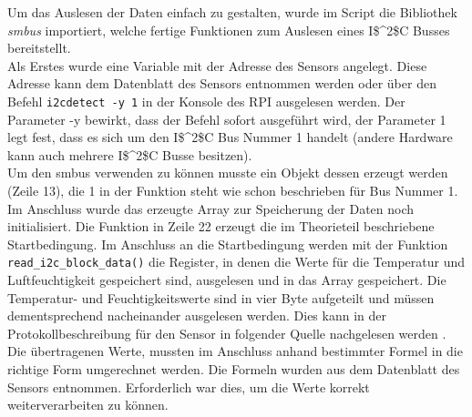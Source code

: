 Um das Auslesen der Daten einfach zu gestalten, wurde im Script die Bibliothek \textit{smbus} importiert, welche fertige Funktionen zum Auslesen eines \ac{I$^2$C} Busses bereitstellt.\\
Als Erstes wurde eine Variable mit der Adresse des Sensors angelegt. Diese Adresse kann dem Datenblatt des Sensors entnommen werden oder über den Befehl \texttt{i2cdetect -y 1} in der Konsole des \ac{RPI} ausgelesen werden. Der Parameter -y bewirkt, dass der Befehl sofort ausgeführt wird, der Parameter 1 legt fest, dass es sich um den \ac{I$^2$C} Bus Nummer 1 handelt (andere Hardware kann auch mehrere \ac{I$^2$C} Busse besitzen).\\
Um den smbus verwenden zu können musste ein Objekt dessen erzeugt werden (Zeile 13), die 1 in der Funktion steht wie schon beschrieben für Bus Nummer 1. Im Anschluss wurde das erzeugte Array zur Speicherung der Daten noch initialisiert. Die Funktion in Zeile 22 erzeugt die im Theorieteil beschriebene Startbedingung. Im Anschluss an die Startbedingung werden mit der Funktion \texttt{read\_i2c\_block\_data()} die Register, in denen die Werte für die Temperatur und Luftfeuchtigkeit gespeichert sind, ausgelesen und in das Array gespeichert. Die Temperatur- und Feuchtigkeitswerte sind in vier Byte aufgeteilt und müssen dementsprechend nacheinander ausgelesen werden. Dies kann in der Protokollbeschreibung für den Sensor in folgender Quelle nachgelesen werden \citep{Datenblatt_I2C_HYT221}. Die übertragenen Werte, mussten im Anschluss anhand bestimmter Formel in die richtige Form umgerechnet werden. Die Formeln wurden aus dem Datenblatt des Sensors entnommen. Erforderlich war dies, um die Werte korrekt weiterverarbeiten zu können.



